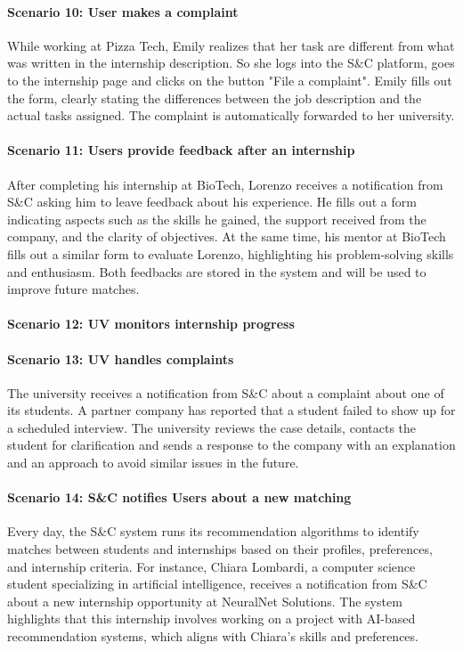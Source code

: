 \paragraph{Scenario 10: User makes a complaint}
While working at Pizza Tech, Emily realizes that her task are different from what was written in the internship description. So she logs into the S\&C platform, goes to the internship page and clicks on the button "File a complaint". Emily fills out the form, clearly stating the differences between the job description and the actual tasks assigned. The complaint is automatically forwarded to her university.

\paragraph{Scenario 11: Users provide feedback after an internship}
After completing his internship at BioTech, Lorenzo receives a notification from S\&C asking him to leave feedback about his experience. He fills out a form indicating aspects such as the skills he gained, the support received from the company, and the clarity of objectives. At the same time, his mentor at BioTech fills out a similar form to evaluate Lorenzo, highlighting his problem-solving skills and enthusiasm. Both feedbacks are stored in the system and will be used to improve future matches.

\paragraph{Scenario 12: UV monitors internship progress}

\paragraph{Scenario 13: UV handles complaints}
The university receives a notification from S\&C about a complaint about one of its students. A partner company has reported that a student failed to show up for a scheduled interview. The university reviews the case details, contacts the student for clarification and sends a response to the company with an explanation and an approach to avoid similar issues in the future.

\paragraph{Scenario 14: S\&C notifies Users about a new matching}
Every day, the S\&C system runs its recommendation algorithms to identify matches between students and internships based on their profiles, preferences, and internship criteria. For instance, Chiara Lombardi, a computer science student specializing in artificial intelligence, receives a notification from S\&C about a new internship opportunity at NeuralNet Solutions. The system highlights that this internship involves working on a project with AI-based recommendation systems, which aligns with Chiara's skills and preferences.

